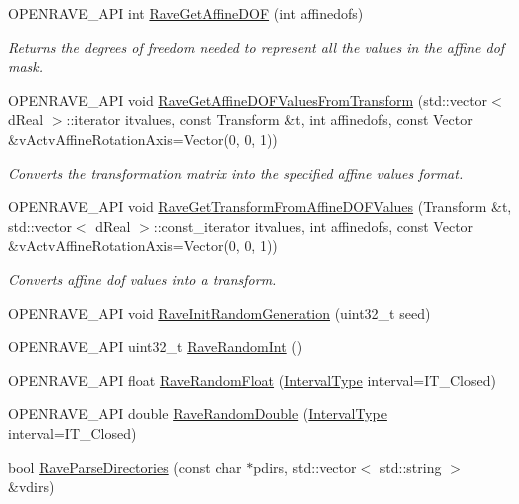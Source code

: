 \begin{DoxyCompactItemize}
OPENRAVE\_\-API int \hyperlink{namespaceOpenRAVE_a240dc0d7e6ff803758ece938c97ecb09}{RaveGetAffineDOF} (int affinedofs)
\begin{DoxyCompactList}\small\item\em Returns the degrees of freedom needed to represent all the values in the affine dof mask. \item\end{DoxyCompactList}\item 
OPENRAVE\_\-API void \hyperlink{namespaceOpenRAVE_a66055231535a166b71d8815e8d2a73a7}{RaveGetAffineDOFValuesFromTransform} (std::vector$<$ dReal $>$::iterator itvalues, const Transform \&t, int affinedofs, const Vector \&vActvAffineRotationAxis=Vector(0, 0, 1))
\begin{DoxyCompactList}\small\item\em Converts the transformation matrix into the specified affine values format. \item\end{DoxyCompactList}\item 
OPENRAVE\_\-API void \hyperlink{namespaceOpenRAVE_a34bfae69aaaf88137c16407df7048aea}{RaveGetTransformFromAffineDOFValues} (Transform \&t, std::vector$<$ dReal $>$::const\_\-iterator itvalues, int affinedofs, const Vector \&vActvAffineRotationAxis=Vector(0, 0, 1))
\begin{DoxyCompactList}\small\item\em Converts affine dof values into a transform. \item\end{DoxyCompactList}\item 
OPENRAVE\_\-API void \hyperlink{namespaceOpenRAVE_af3e449c98bda910013e4b323573306d1}{RaveInitRandomGeneration} (uint32\_\-t seed)
\item 
OPENRAVE\_\-API uint32\_\-t \hyperlink{namespaceOpenRAVE_abc3b63337e9c8767dc7e18b30747029b}{RaveRandomInt} ()
\item 
OPENRAVE\_\-API float \hyperlink{namespaceOpenRAVE_a6fe8f01c322a5b2e5bccb4928f93ac0f}{RaveRandomFloat} (\hyperlink{namespaceOpenRAVE_a0d04dbfb6240509e26f8336ab1756937}{IntervalType} interval=IT\_\-Closed)
\item 
OPENRAVE\_\-API double \hyperlink{namespaceOpenRAVE_aee509dcc75db9b102d2fd497e1f21de6}{RaveRandomDouble} (\hyperlink{namespaceOpenRAVE_a0d04dbfb6240509e26f8336ab1756937}{IntervalType} interval=IT\_\-Closed)
\item 
\hypertarget{namespaceOpenRAVE_a32f8afb07145a214f906ea827c14422d}{
bool \hyperlink{namespaceOpenRAVE_a32f8afb07145a214f906ea827c14422d}{RaveParseDirectories} (const char $\ast$pdirs, std::vector$<$ std::string $>$ \&vdirs)}
\label{namespaceOpenRAVE_a32f8afb07145a214f906ea827c14422d}


\end{DoxyCompactItemize}

